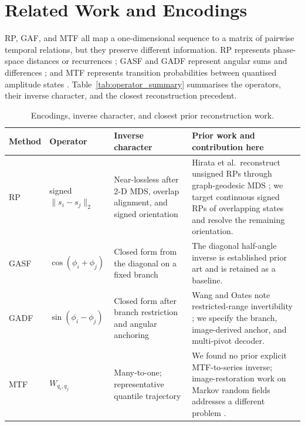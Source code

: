 \documentclass[10pt,a4paper,parskip=half-]{scrartcl}
\begin{document}
\FloatBarrier

\section{Related Work and Encodings}
\label{sec:related_encodings}

RP, GAF, and MTF all map a one-dimensional sequence to a matrix of pairwise temporal relations, but they preserve different information. RP represents phase-space distances or recurrences \cite{eckmann1995recurrence,marwan2007recurrence}; GASF and GADF represent angular sums and differences \cite{wang2015encoding}; and MTF represents transition probabilities between quantised amplitude states \cite{wang2015encoding2}. Table~\ref{tab:operator_summary} summarises the operators, their inverse character, and the closest reconstruction precedent.

\begin{table}[!htbp]
\centering
\caption{Encodings, inverse character, and closest prior reconstruction work.}
\label{tab:operator_summary}
\label{tab:novelty}
\small

\setlength{\tabcolsep}{4pt}
\begin{tabular}{@{}L{0.08\textwidth}L{0.25\textwidth}L{0.27\textwidth}L{0.32\textwidth}@{}}
\toprule
Method & Operator & Inverse character & Prior work and contribution here \\
\midrule

RP & signed \(\lVert s_i-s_j\rVert_2\) & Near-lossless after 2-D MDS, overlap alignment, and signed orientation & Hirata et al.\ reconstruct unsigned RPs through graph-geodesic MDS \cite{hirata2008reproduction}; we target continuous signed RPs of overlapping states and resolve the remaining orientation. \\
GASF & \(\cos(\phi_i+\phi_j)\) & Closed form from the diagonal on a fixed branch & The diagonal half-angle inverse is established prior art \cite{huamin2020reconstruction} and is retained as a baseline. \\
GADF & \(\sin(\phi_i-\phi_j)\) & Closed form after branch restriction and angular anchoring & Wang and Oates note restricted-range invertibility \cite{wang2015encoding}; we specify the branch, image-derived anchor, and multi-pivot decoder. \\
MTF & \(W_{q_i,q_j}\) & Many-to-one; representative quantile trajectory & We found no prior explicit MTF-to-series inverse; image-restoration work on Markov random fields addresses a different problem \cite{kopec1994document,kliewer2006iterative}. \\
\bottomrule
\end{tabular}
\end{table}
\end{document}
